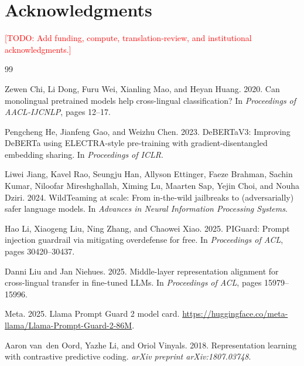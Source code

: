 \documentclass[10pt,twocolumn]{article}
\newcommand{\todo}[1]{\textcolor{red}{[TODO: #1]}}
\begin{document}
\section*{Acknowledgments}

\todo{Add funding, compute, translation-review, and institutional acknowledgments.}

\begin{thebibliography}{99}

Zewen Chi, Li Dong, Furu Wei, Xianling Mao, and Heyan Huang. 2020.
\newblock Can monolingual pretrained models help cross-lingual classification?
\newblock In \emph{Proceedings of AACL-IJCNLP}, pages 12--17.

Pengcheng He, Jianfeng Gao, and Weizhu Chen. 2023.
\newblock DeBERTaV3: Improving DeBERTa using ELECTRA-style pre-training with
gradient-disentangled embedding sharing.
\newblock In \emph{Proceedings of ICLR}.

Liwei Jiang, Kavel Rao, Seungju Han, Allyson Ettinger, Faeze Brahman,
Sachin Kumar, Niloofar Mireshghallah, Ximing Lu, Maarten Sap, Yejin Choi,
and Nouha Dziri. 2024.
\newblock WildTeaming at scale: From in-the-wild jailbreaks to
(adversarially) safer language models.
\newblock In \emph{Advances in Neural Information Processing Systems}.

Hao Li, Xiaogeng Liu, Ning Zhang, and Chaowei Xiao. 2025.
\newblock PIGuard: Prompt injection guardrail via mitigating overdefense for free.
\newblock In \emph{Proceedings of ACL}, pages 30420--30437.

Danni Liu and Jan Niehues. 2025.
\newblock Middle-layer representation alignment for cross-lingual transfer in
fine-tuned LLMs.
\newblock In \emph{Proceedings of ACL}, pages 15979--15996.

Meta. 2025.
\newblock Llama Prompt Guard 2 model card.
\newblock \url{https://huggingface.co/meta-llama/Llama-Prompt-Guard-2-86M}.

Aaron van~den Oord, Yazhe Li, and Oriol Vinyals. 2018.
\newblock Representation learning with contrastive predictive coding.
\newblock \emph{arXiv preprint arXiv:1807.03748}.


\end{thebibliography}
\end{document}
